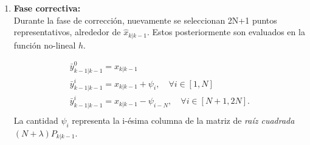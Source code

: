 \begin{enumerate}
\item \textbf{Fase correctiva:}\\
Durante la fase de correcci\'on, nuevamente se seleccionan 2N+1 puntos representativos, alrededor de $\hat{x}_{k|k-1}$. Estos posteriormente son evaluados en la funci\'on no-lineal $h$.

\begin{equation}
\label{eq:eq24}
\begin{gathered}
\bar{y}_{k-1| k-1}^0 = \hat{x}_{k|k-1}\\
\bar{y}_{k-1| k-1}^i = \hat{x}_{k|k-1}+ \psi_i, \quad  \forall i \in [1, N]\\
\bar{y}_{k-1| k-1}^i = \hat{x}_{k|k-1}- \psi_{i-N}, \quad  \forall i \in [N+1, 2N].\\
\end{gathered}
\end{equation}
La cantidad $\psi_i$ representa la i-\'esima columna de la matriz de \textit{ra\'iz cuadrada} $(N+\lambda)P_{k|k-1}$.


\end{enumerate}
